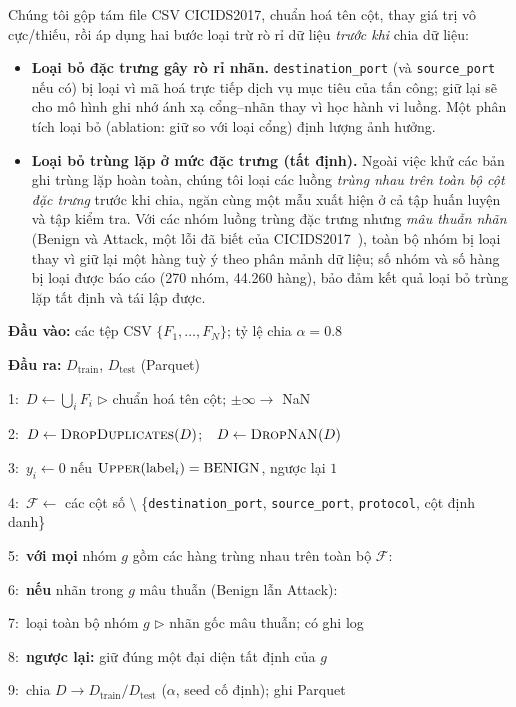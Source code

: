 \documentclass[conference]{IEEEtran}
\begin{document}
Chúng tôi gộp tám file CSV CICIDS2017, chuẩn hoá tên cột, thay giá trị vô cực/thiếu, rồi áp dụng hai bước loại trừ rò rỉ dữ liệu \emph{trước khi} chia dữ liệu:

\begin{itemize}
  \item \textbf{Loại bỏ đặc trưng gây rò rỉ nhãn.} \texttt{destination\_port} (và \texttt{source\_port} nếu có) bị loại vì mã hoá trực tiếp dịch vụ mục tiêu của tấn công; giữ lại sẽ cho mô hình ghi nhớ ánh xạ cổng--nhãn thay vì học hành vi luồng. Một phân tích loại bỏ (ablation: giữ so với loại cổng) định lượng ảnh hưởng.
  \item \textbf{Loại bỏ trùng lặp ở mức đặc trưng (tất định).} Ngoài việc khử các bản ghi trùng lặp hoàn toàn, chúng tôi loại các luồng \emph{trùng nhau trên toàn bộ cột đặc trưng} trước khi chia, ngăn cùng một mẫu xuất hiện ở cả tập huấn luyện và tập kiểm tra. Với các nhóm luồng trùng đặc trưng nhưng \emph{mâu thuẫn nhãn} (Benign và Attack, một lỗi đã biết của CICIDS2017~\cite{lanvin2023errors}), toàn bộ nhóm bị loại thay vì giữ lại một hàng tuỳ ý theo phân mảnh dữ liệu; số nhóm và số hàng bị loại được báo cáo (270 nhóm, 44.260 hàng), bảo đảm kết quả loại bỏ trùng lặp tất định và tái lập được.
\end{itemize}


\begin{algorithm}[t]
\caption{Tiền xử lý loại trừ rò rỉ cho CICIDS2017}
\label{alg:prep}
\footnotesize
\begin{list}{}{\setlength{\leftmargin}{0.8em}\setlength{\itemsep}{1pt}\setlength{\parsep}{0pt}\setlength{\topsep}{2pt}}
\item \textbf{Đầu vào:} các tệp CSV $\{F_1,\dots,F_N\}$; tỷ lệ chia $\alpha{=}0.8$
\item \textbf{Đầu ra:} $D_{\text{train}}$, $D_{\text{test}}$ (Parquet)
\item 1:\ $D \gets \bigcup_i F_i$ \hfill $\triangleright$ chuẩn hoá tên cột; $\pm\infty \rightarrow$ NaN
\item 2:\ $D \gets \textsc{DropDuplicates}(D)$;\ \ $D \gets \textsc{DropNaN}(D)$
\item 3:\ $y_i \gets 0$ nếu $\textsc{Upper}(\mathrm{label}_i) = \mathrm{BENIGN}$, ngược lại $1$
\item 4:\ $\mathcal{F} \gets$ các cột số $\setminus$ \{\texttt{destination\_port}, \texttt{source\_port}, \texttt{protocol}, cột định danh\}
\item 5:\ \textbf{với mọi} nhóm $g$ gồm các hàng trùng nhau trên toàn bộ $\mathcal{F}$:
\item 6:\ \quad \textbf{nếu} nhãn trong $g$ mâu thuẫn (Benign lẫn Attack):
\item 7:\ \quad\quad loại toàn bộ nhóm $g$ \hfill $\triangleright$ nhãn gốc mâu thuẫn; có ghi log
\item 8:\ \quad \textbf{ngược lại:} giữ đúng một đại diện tất định của $g$
\item 9:\ chia $D \rightarrow D_{\text{train}}/D_{\text{test}}$ ($\alpha$, seed cố định); ghi Parquet
\end{list}
\end{algorithm}
\end{document}
